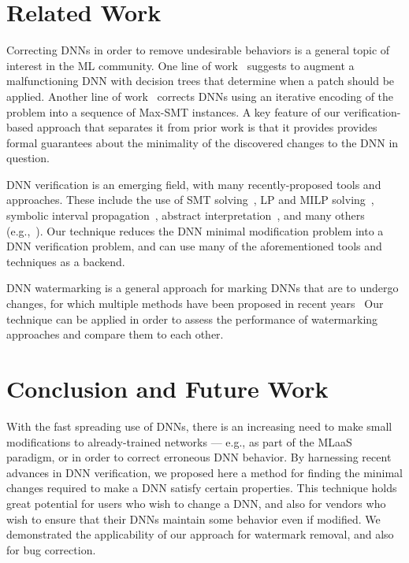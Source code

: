 \documentclass{easychair}
\newcommand{\guy}[1]{\marginpar{\textcolor{orange}{Guy: #1}}}
\begin{document}
\guy{Questions about ACAS Xu: what norm did we use? Are the two graphs
  identical? Was a single edge changed in both?}

\section{Related Work}
\label{sec:relatedWork}

Correcting DNNs in order to remove undesirable behaviors is a general
topic of interest in the ML community. One line of
work~\cite{KaLe18,KaFu18} suggests to augment a malfunctioning DNN
with decision trees that determine when a patch should be
applied. Another line of work~\cite{SoTh19} corrects DNNs using an
iterative encoding of the problem into a sequence of Max-SMT
instances. A key feature of our verification-based approach that
separates it from prior work is that it provides provides formal
guarantees about the minimality of the discovered changes to the DNN
in question.

DNN verification is an emerging field, with many recently-proposed
tools and approaches. These include the use of SMT
solving~\cite{HuKwWaWu17,KaBaDiJuKo17Reluplex,KaHuIbJuLaLiShThWuZeDiKoBa19Marabou},
LP and MILP solving~\cite{Ehlers2017,TjXiTe19}, symbolic interval
propagation~\cite{WaPeWhYaJa18}, abstract
interpretation~\cite{GeMiDrTsChVe18}, and many others
(e.g.,~\cite{BuTuToKoMu18,DuJhSaTi18,LoMa17,NaKaRySaWa17,SiGePuVe19}).
Our technique reduces the DNN minimal modification problem into a DNN
verification problem, and can use many of the aforementioned tools and
techniques as a backend.

DNN watermarking is a general approach for marking DNNs that are to undergo
changes, for which multiple methods have been proposed in recent years~\cite{AdBaPiKeWatermarking,ChRoKo18,LePeTr19,UcNaSaSa17,VeUsTaOcGa11}
Our technique can be applied in order to assess the
performance of watermarking approaches and compare them to each other.


\section{Conclusion and Future Work}
\label{sec:conclusion}

With the fast spreading use of DNNs, there is an increasing need to
make small modifications to already-trained networks --- e.g., as part
of the MLaaS paradigm, or in order to correct erroneous DNN behavior. By
harnessing recent advances in DNN verification, we proposed here a
method for finding the minimal changes required to make a DNN satisfy
certain properties. This technique holds great potential
for users who wish to change a DNN, and also for vendors who
wish to ensure that their DNNs maintain some behavior even if
modified. We demonstrated the applicability of our approach for 
watermark removal, and also for bug correction.
\end{document}
